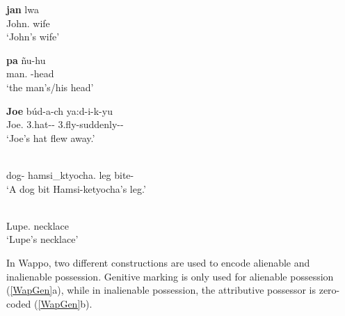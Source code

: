 
\begin{exe}\ex\label{HavGen}
\begin{xlist} 
\ex \gll \textbf{jan} lwa\\
John.\acc{} wife\\
\glt `John's wife' %

\ex\gll \textbf{pa} \~nu-hu\\
man.\acc{} \dem{}-head\\
\glt `the man's/his head' %
\end{xlist}
\end{exe}

\begin{exe}\ex\label{WalGen}
\gll \textbf{Joe} b\'ud-a-ch ya:d-i-k-yu\\
Joe.\acc{} 3.hat--\nom{} 3.fly-suddenly-\ssbj{}-\aux{}\\
\glt `Joe's hat flew away.'
\end{exe}

\begin{exe}\ex\label{YavGen}
\begin{xlist}\ex\gll\label{YavInal} \textbf{}  \\
dog-\nom{} hamsi\_ktyocha.\acc{} leg bite-\compl{}\\
\glt `A dog bit Hamsi-ketyocha's leg.'

\ex\gll\label{YavAlien}\textbf{} \\
Lupe.\acc{} necklace\\
\glt `Lupe's necklace'
\end{xlist}
\end{exe}

In Wappo, two different constructions are used to encode alienable and inalienable possession.
Genitive marking is only used for alienable possession (\ref{WapGen}a), while in inalienable possession, the attributive possessor is zero-coded (\ref{WapGen}b).

